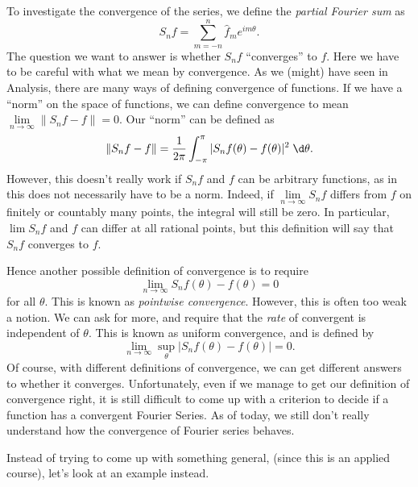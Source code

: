 \documentclass[a4paper]{article}
\begin{document}
To investigate the convergence of the series, we define the \emph{partial Fourier sum} as
\[
  S_n f = \sum_{m = -n}^n \hat{f}_m e^{im\theta}.
\]
The question we want to answer is whether $S_n f$ ``converges'' to $f$. Here we have to be careful with what we mean by convergence. As we (might) have seen in Analysis, there are many ways of defining convergence of functions. If we have a ``norm'' on the space of functions, we can define convergence to mean $\lim\limits_{n\to \infty}\|S_n f - f\| = 0$. Our ``norm'' can be defined as
\[
  \|S_n f - f\| = \frac{1}{2\pi}\int_{-\pi}^\pi |S_n f(\theta) - f(\theta)|^2 \;\d \theta.
\]
However, this doesn't really work if $S_n f$ and $f$ can be arbitrary functions, as in this does not necessarily have to be a norm. Indeed, if $\lim\limits_{n \to \infty}S_n f$ differs from $f$ on finitely or countably many points, the integral will still be zero. In particular, $\lim S_n f$ and $f$ can differ at all rational points, but this definition will say that $S_n f$ converges to $f$.

Hence another possible definition of convergence is to require
\[
  \lim_{n \to \infty}S_n f(\theta) - f(\theta) = 0
\]
for all $\theta$. This is known as \emph{pointwise convergence}. However, this is often too weak a notion. We can ask for more, and require that the \emph{rate} of convergent is independent of $\theta$. This is known as uniform convergence, and is defined by
\[
  \lim_{n \to \infty}\sup_{\theta} |S_n f(\theta) - f(\theta)| = 0.
\]
Of course, with different definitions of convergence, we can get different answers to whether it converges. Unfortunately, even if we manage to get our definition of convergence right, it is still difficult to come up with a criterion to decide if a function has a convergent Fourier Series. As of today, we still don't really understand how the convergence of Fourier series behaves.

Instead of trying to come up with something general, (since this is an applied course), let's look at an example instead.
\end{document}
